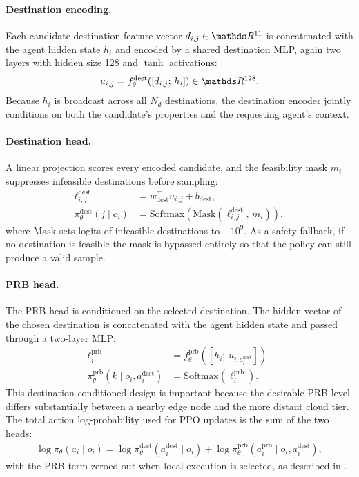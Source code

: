 \paragraph{Destination encoding.}
Each candidate destination feature vector \(d_{i,j} \in \R^{11}\) is concatenated with the agent hidden state \(h_i\) and encoded by a shared destination MLP, again two layers with hidden size 128 and \(\tanh\) activations:
\begin{align}
u_{i,j} = f_{\theta}^{\mathrm{dest}}\!\left([d_{i,j} ;\, h_i]\right) \in \R^{128}.
\end{align}
Because \(h_i\) is broadcast across all \(N_d\) destinations, the destination encoder jointly conditions on both the candidate's properties and the requesting agent's context.

\paragraph{Destination head.}
A linear projection scores every encoded candidate, and the feasibility mask \(m_i\) suppresses infeasible destinations before sampling:
\begin{align}
\ell_{i,j}^{\mathrm{dest}} &= w_{\mathrm{dest}}^\top u_{i,j} + b_{\mathrm{dest}}, \\
\pi_{\theta}^{\mathrm{dest}}(j \mid o_i) &=
\mathrm{Softmax}\!\left(\mathrm{Mask}\!\left(\ell_{i,j}^{\mathrm{dest}},\, m_i\right)\right),
\end{align}
where \(\mathrm{Mask}\) sets logits of infeasible destinations to \(-10^{9}\). As a safety fallback, if no destination is feasible the mask is bypassed entirely so that the policy can still produce a valid sample.

\paragraph{PRB head.}
The PRB head is conditioned on the selected destination. The hidden vector of the chosen destination is concatenated with the agent hidden state and passed through a two-layer MLP:
\begin{align}
\ell_i^{\mathrm{prb}} &= f_{\theta}^{\mathrm{prb}}\!\left([h_i ;\, u_{i,a_i^{\mathrm{dest}}}]\right), \\
\pi_{\theta}^{\mathrm{prb}}(k \mid o_i, a_i^{\mathrm{dest}}) &=
\mathrm{Softmax}\!\left(\ell_i^{\mathrm{prb}}\right).
\end{align}
This destination-conditioned design is important because the desirable PRB level differs substantially between a nearby edge node and the more distant cloud tier. The total action log-probability used for PPO updates is the sum of the two heads:
\begin{align}
\log \pi_{\theta}(a_i \mid o_i) = \log \pi_{\theta}^{\mathrm{dest}}(a_i^{\mathrm{dest}} \mid o_i)
+ \log \pi_{\theta}^{\mathrm{prb}}(a_i^{\mathrm{prb}} \mid o_i, a_i^{\mathrm{dest}}),
\end{align}
with the PRB term zeroed out when local execution is selected, as described in .

